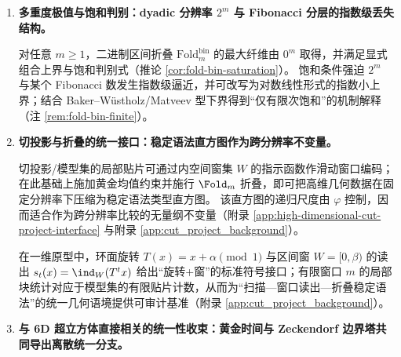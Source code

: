 \begin{enumerate}
  \item \textbf{多重度极值与饱和判别：dyadic 分辨率 \texorpdfstring{$2^m$}{2^m} 与 Fibonacci 分层的指数级丢失结构。}

  \begin{theorem}
  \label{thm:terminal-foldbin-saturation-diophantine}
  对任意 \(m\ge 1\)，二进制区间折叠 \(\mathrm{Fold}^{\mathrm{bin}}_m\) 的最大纤维由 \(0^m\) 取得，并满足显式组合上界与饱和判别式（推论 \ref{cor:fold-bin-saturation}）。
  饱和条件强迫 \(2^m\) 与某个 Fibonacci 数发生指数级逼近，并可改写为对数线性形式的指数小上界；结合 Baker--W\"ustholz/Matveev 型下界得到“仅有限次饱和”的机制解释（注 \ref{rem:fold-bin-finite}）。
  \end{theorem}

  \item \textbf{切投影与折叠的统一接口：稳定语法直方图作为跨分辨率不变量。}

  \begin{proposition}[cut-and-project \texorpdfstring{$\Rightarrow$}{=>} 折叠直方图不变量的接口]
  \label{prop:terminal-cut-project-to-fold-hist}
  切投影/模型集的局部贴片可通过内空间窗集 \(W\) 的指示函数作滑动窗口编码；在此基础上施加黄金均值约束并施行 \(\Fold_m\) 折叠，即可把高维几何数据在固定分辨率下压缩为稳定语法类型直方图。
  该直方图的递归尺度由 \(\varphi\) 控制，因而适合作为跨分辨率比较的无量纲不变量（附录 \ref{app:high-dimensional-cut-project-interface} 与附录 \ref{app:cut_project_background}）。
  \end{proposition}

  \begin{corollary}[环面参数化与旋转扫描的可审计原型]
  \label{cor:terminal-rotation-window-prototype}
  在一维原型中，环面旋转 \(T(x)=x+\alpha\pmod 1\) 与区间窗 \(W=[0,\beta)\) 的读出 \(s_t(x)=\ind_W(T^t x)\) 给出“旋转+\(\)窗”的标准符号接口；有限窗口 \(m\) 的局部块统计对应于模型集的有限贴片计数，从而为“扫描—窗口读出—折叠稳定语法”的统一几何语境提供可审计基准（附录 \ref{app:cut_project_background}）。
  \end{corollary}

  \item \textbf{与 6D 超立方体直接相关的统一性收束：黄金时间与 Zeckendorf 边界塔共同导出离散统一分支。}
  \end{enumerate}

